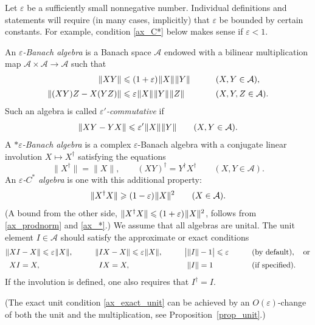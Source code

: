 \documentclass[12pt]{article}
\newcommand{\calA}{\mathcal{A}}
\newcommand{\ts}{\mkern1mu}
\newcommand{\eps}{\varepsilon}
\renewcommand{\le}{\leqslant}
\renewcommand{\ge}{\geqslant}
\newtheorem[definition]{Definition}[Theorem]{Definition}
\newtheorem[remark]{Example}[Theorem]{Example}
\newtheorem[remark]{Remark}[Theorem]{Remark}
\newtheorem[remark]{Question}[Theorem]{Open question}
\newtheorem*[definition]{definition}{Definition}
\newtheorem*[remark]{example}{Example}
\newtheorem*[remark]{remark}{Remark}
\newtheorem*[remark]{question}{Open question}
\numberwithin{equation}{section}
\begin{document}
Let $\eps$ be a sufficiently small nonnegative number. Individual definitions and statements will require (in many cases, implicitly) that $\eps$ be bounded by certain constants. For example, condition \eqref{ax_C*} below makes sense if $\eps<1$.

\begin{Definition}
An \emph{$\eps$-Banach algebra} is a Banach space $\calA$ endowed with a bilinear multiplication map $\calA\times \calA\to \calA$ such that
\begin{alignat}{2}
\label{ax_prodnorm}
\|XY\| &\le (1+\eps)\ts\|X\|\ts\|Y\|\qquad &&(X,Y\in \calA),\\[2pt]
\label{ax_assoc}
\|(XY)Z-X(YZ)\| &\le \eps\ts\|X\|\ts\|Y\|\ts\|Z\|\qquad &&(X,Y,Z\in \calA).
\end{alignat}
Such an algebra is called \emph{$\eps'$-commutative} if
\begin{equation}
\label{ax_comm}
\|XY-YX\|\le \eps'\ts\|X\|\ts\|Y\|\qquad (X,Y\in \calA).
\end{equation}
A \emph{$*\eps$-Banach algebra} is a complex $\eps$-Banach algebra with a conjugate linear involution $X\mapsto X^\dag$ satisfying the equations
\begin{equation}
\label{ax_*}
\|X^\dag\|=\|X\|,\qquad (XY)^\dag=Y^\dag X^\dag\qquad (X,Y\in \calA).
\end{equation}
An \emph{$\eps$-$C^*$ algebra} is one with this additional property:
\begin{equation}
\label{ax_C*}
\|X^{\dag}X\|\ge (1-\eps)\ts\|X\|^{2}\qquad (X\in \calA).
\end{equation}
(A bound from the other side, $\|X^{\dag}X\|\le (1+\eps)\ts\|X\|^{2}$, follows from \eqref{ax_prodnorm} and \eqref{ax_*}.) We assume that all algebras are unital. The unit element $I\in\calA$ should satisfy the approximate or exact conditions
\begin{alignat}{4}
\label{ax_eps_unit}
\|XI&-X\|\le\eps\ts\|X\|,\qquad &\|IX&-X\|\le\eps\ts\|X\|,\qquad
&\bigl|\|I\|&-1\bigr|\le\eps\qquad &&\text{(by default)},\quad \text{or}\\[2pt]
\label{ax_exact_unit}
XI&=X,\qquad &IX&=X,\qquad
&\|I\|&=1\qquad &&\text{(if specified)}.
\end{alignat}
If the involution is defined, one also requires that $I^\dag=I$.
\end{Definition}
(The exact unit condition \eqref{ax_exact_unit} can be achieved by an $O(\eps)$-change of both the unit and the multiplication, see Proposition~\ref{prop_unit}.)
\end{document}
